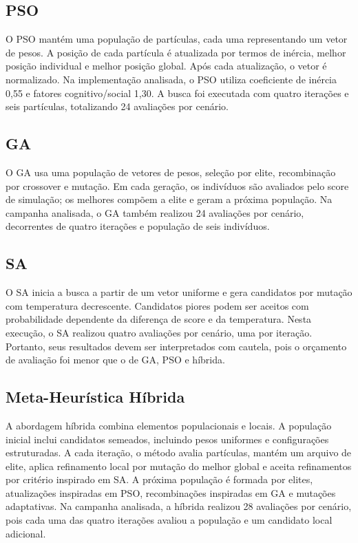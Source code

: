 \documentclass[12pt,a4paper]{article}
\begin{document}
\subsection{PSO}

O PSO mantém uma população de partículas, cada uma representando um vetor de pesos. A posição de cada partícula é atualizada por termos de inércia, melhor posição individual e melhor posição global. Após cada atualização, o vetor é normalizado. Na implementação analisada, o PSO utiliza coeficiente de inércia 0,55 e fatores cognitivo/social 1,30. A busca foi executada com quatro iterações e seis partículas, totalizando 24 avaliações por cenário.

\subsection{GA}

O GA usa uma população de vetores de pesos, seleção por elite, recombinação por crossover e mutação. Em cada geração, os indivíduos são avaliados pelo score de simulação; os melhores compõem a elite e geram a próxima população. Na campanha analisada, o GA também realizou 24 avaliações por cenário, decorrentes de quatro iterações e população de seis indivíduos.

\subsection{SA}

O SA inicia a busca a partir de um vetor uniforme e gera candidatos por mutação com temperatura decrescente. Candidatos piores podem ser aceitos com probabilidade dependente da diferença de score e da temperatura. Nesta execução, o SA realizou quatro avaliações por cenário, uma por iteração. Portanto, seus resultados devem ser interpretados com cautela, pois o orçamento de avaliação foi menor que o de GA, PSO e híbrida.

\subsection{Meta-Heurística Híbrida}

A abordagem híbrida combina elementos populacionais e locais. A população inicial inclui candidatos semeados, incluindo pesos uniformes e configurações estruturadas. A cada iteração, o método avalia partículas, mantém um arquivo de elite, aplica refinamento local por mutação do melhor global e aceita refinamentos por critério inspirado em SA. A próxima população é formada por elites, atualizações inspiradas em PSO, recombinações inspiradas em GA e mutações adaptativas. Na campanha analisada, a híbrida realizou 28 avaliações por cenário, pois cada uma das quatro iterações avaliou a população e um candidato local adicional.
\end{document}

